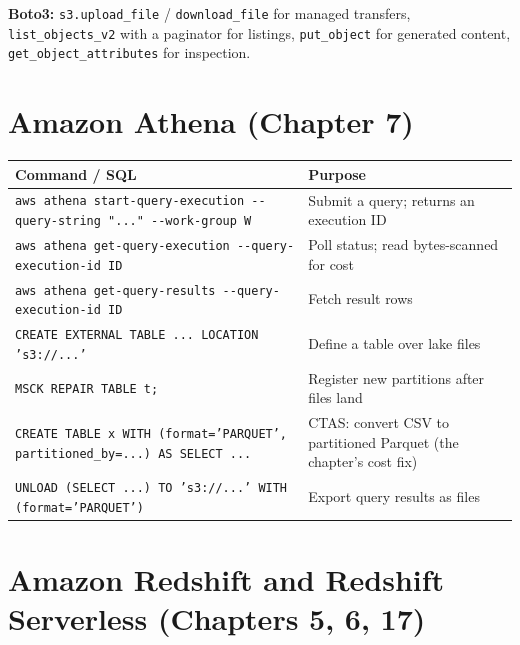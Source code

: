 \noindent\textbf{Boto3:} \texttt{s3.upload\_file} / \texttt{download\_file} for managed transfers,
\texttt{list\_objects\_v2} with a paginator for listings, \texttt{put\_object} for generated
content, \texttt{get\_object\_attributes} for inspection.

\section{Amazon Athena (Chapter 7)}
%

\begin{center}
\footnotesize
\begin{tabular}{@{}p{7.2cm}p{7.6cm}@{}}
\toprule
\textbf{Command / SQL} & \textbf{Purpose} \\
\midrule
\texttt{aws athena start-query-execution -{}-query-string "..." -{}-work-group W} & Submit a query; returns an execution ID \\
\texttt{aws athena get-query-execution -{}-query-execution-id ID} & Poll status; read bytes-scanned for cost \\
\texttt{aws athena get-query-results -{}-query-execution-id ID} & Fetch result rows \\
\texttt{CREATE EXTERNAL TABLE ... LOCATION 's3://...'} & Define a table over lake files \\
\texttt{MSCK REPAIR TABLE t;} & Register new partitions after files land \\
\texttt{CREATE TABLE x WITH (format='PARQUET', partitioned\_by=...) AS SELECT ...} & CTAS: convert CSV to partitioned Parquet (the chapter's cost fix) \\
\texttt{UNLOAD (SELECT ...) TO 's3://...' WITH (format='PARQUET')} & Export query results as files \\
\bottomrule
\end{tabular}
\end{center}

\section{Amazon Redshift and Redshift Serverless (Chapters 5, 6, 17)}
%

